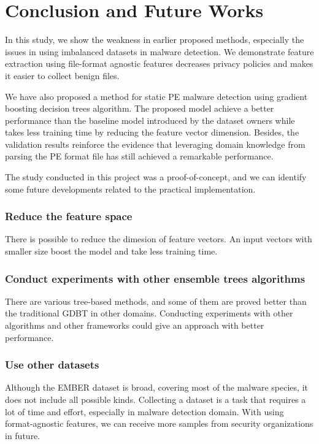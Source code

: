 \documentclass[runningheads]{llncs}
\begin{document}
\section{Conclusion and Future Works}

In this study, we show the weakness in earlier proposed methods, especially the issues in using imbalanced datasets in malware detection. We demonstrate feature extraction using file-format agnostic features decreases privacy policies and makes it easier to collect benign files. 

We have also proposed a method for static PE malware detection using gradient boosting decision trees algorithm. The proposed model achieve a better performance than the baseline model introduced by the dataset owners while takes less training time by reducing the feature vector dimension. Besides, the validation results reinforce the evidence that leveraging domain knowledge from parsing the PE format file has still achieved a remarkable performance.

The study conducted in this project was a proof-of-concept, and we can identify some future developments related to the practical implementation.

\subsubsection{Reduce the feature space}

There is possible to reduce the dimesion of feature vectors. An input vectors with smaller size boost the model and take less training time. 

\subsubsection{Conduct experiments with other ensemble trees algorithms}


There are various tree-based methods, and some of them are proved better than the traditional GDBT in other domains. Conducting experiments with other algorithms and other frameworks could give an approach with better performance.

\subsubsection{Use other datasets}

Although the EMBER dataset is broad, covering most of the malware species, it does not include all possible kinds. Collecting a dataset is a task that requires a lot of time and effort, especially in malware detection domain. With using format-agnostic features, we can receive more samples from security organizations in future. 



\end{document}
